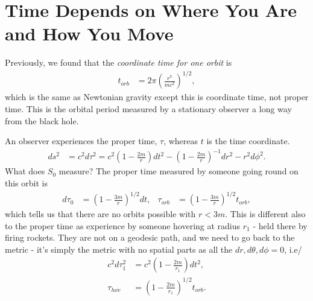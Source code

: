 \documentclass[a4paper, 11pt, normalem]{report}
\begin{document}
\section{Time Depends on Where You Are and How You Move}
Previously, we found that the \emph{coordinate time for one orbit} is
\begin{align}
    t_{orb} &= 2\pi\left(\frac{r^3}{mc^2}\right)^{1/2},
\end{align}
which is the same as Newtonian gravity except this is coordinate time, not proper time. 
This is the orbital period measured by a stationary observer a long way from the black hole. 
\begin{figure}[H]
    \centering
\end{figure}
An observer experiences the proper time, $\tau$, whereas $t$ is the time coordinate.
\begin{align}
    ds^2 &= c^2d\tau^2 = c^2\left(1-\frac{2m}{r}\right)dt^2 - \left(1-\frac{2m}{r}\right)^{-1}dr^2 - r^2d\phi^2.
\end{align}
What does $S_0$ measure?
The proper time measured by someone going round on this orbit is
\begin{align}
    d\tau_0 &= \left(1-\frac{3m}{r}\right)^{1/2}dt, & \tau_{orb} &= \left(1-\frac{3m}{r}\right)^{1/2}t_{orb},
\end{align}
which tells us that there are no orbits possible with $r<3m$.
This is different also to the proper time as experience by someone hovering at radius $r_1$ - held there by firing rockets. 
They are not on a geodesic path, and we need to go back to the metric - it's simply the metric with no spatial parts as all the $dr,d\theta,d\phi=0$, i.e/
\begin{align}
    c^2d\tau_1^2 &= c^2\left(1-\frac{2m}{r_1}\right)dt^2, \\
    \tau_{hov} &= \left(1-\frac{2m}{r_1}\right)^{1/2}t_{orb}.
\end{align}
\end{document}
